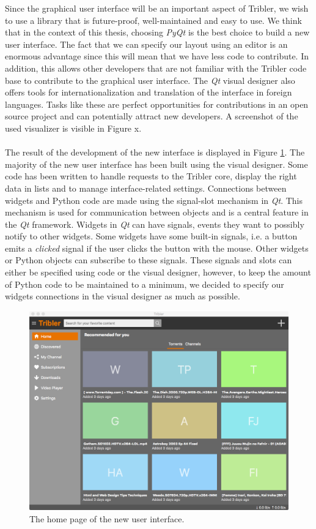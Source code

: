 Since the graphical user interface will be an important aspect of Tribler, we wish to use a library that is future-proof, well-maintained and easy to use. We think that in the context of this thesis, choosing \emph{PyQt} is the best choice to build a new user interface. The fact that we can specify our layout using an editor is an enormous advantage since this will mean that we have less code to contribute. In addition, this allows other developers that are not familiar with the Tribler code base to contribute to the graphical user interface. The \emph{Qt} visual designer also offers tools for internationalization and translation of the interface in foreign languages. Tasks like these are perfect opportunities for contributions in an open source project and can potentially attract new developers. A screenshot of the used visualizer is visible in Figure x.\\\\
The result of the development of the new interface is displayed in Figure \ref{fig:new-gui-1}. The majority of the new user interface has been built using the visual designer. Some code has been written to handle requests to the Tribler core, display the right data in lists and to manage interface-related settings. Connections between widgets and Python code are made using the signal-slot mechanism in \emph{Qt}. This mechanism is used for communication between objects and is a central feature in the \emph{Qt} framework. Widgets in \emph{Qt} can have signals, events they want to possibly notify to other widgets. Some widgets have some built-in signals, i.e. a button emits a \emph{clicked} signal if the user clicks the button with the mouse. Other widgets or Python objects can subscribe to these signals. These signals and slots can either be specified using code or the visual designer, however, to keep the amount of Python code to be maintained to a minimum, we decided to specify our widgets connections in the visual designer as much as possible.\\

\begin{figure}[t]
	\centering
	\includegraphics[width=0.8\columnwidth]{images/improving_qa/newgui1}
	\caption{The home page of the new user interface.}
	\label{fig:new-gui-1}
\end{figure}

